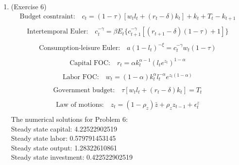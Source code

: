 \documentclass[letterpaper,12pt]{article}
\theoremstyle{definition}
\begin{document}
\begin{enumerate}
	\item(Exercise 6)\\
	\begin{equation} \label{eq1}
	\begin{split}
	\text{Budget cosntraint:} \quad c_{t} = (1 - \tau)[w_{t}l_{t} + (r_{t} - \delta)k_{t}] + k_{t} + T_{t} - k_{t + 1}\\
	\end{split}
	\end{equation}
	\begin{equation} \label{eq2}
	\begin{split}
	\text{Intertemporal Euler:} \quad c_{t}^{-\gamma} = \beta E_{t}\{  c_{t + 1}^{-\gamma}[(r_{t + 1} - \delta)(1 - \tau) + 1]\} \\
	\end{split}
	\end{equation}
	\begin{equation} \label{eq3}
	\begin{split}
	\text{Consumption-leisure Euler:} \quad a(1 - l_{t})^{-\xi} = c_{t}^{-\gamma}w_{t}(1 - \tau)\\
	\end{split}
	\end{equation}
	\begin{equation} \label{eq4}
	\begin{split}
	\text{Capital FOC:} \quad r_{t} = \alpha k_{t}^{\alpha - 1} (l_{t}e^{z_{t}})^{1 - \alpha} \\
	\end{split}
	\end{equation}
	\begin{equation} \label{eq5}
	\begin{split}
	\text{Labor FOC:} \quad w_{t} = (1 - \alpha)k_{t}^{\alpha} l_{t}^{- \alpha} e^{z_{t}(1 - \alpha)} \\
	\end{split}
	\end{equation}
	\begin{equation} \label{eq6}
	\begin{split}
	\text{Government budget:} \quad \tau[w_{t}l_{t} + (r_{t} - \delta)k_{t}] = T_{t}  \\
	\end{split}
	\end{equation}
	\begin{equation} \label{eq7}
	\begin{split}
	\text{Law of motions:} \quad z_{t} = (1 - \rho_{z})\bar{z} + \rho_{z}z_{t - 1} + \epsilon_{t}^{z} \\
	\end{split}
	\end{equation}
	The numerical solutions for Problem 6: \\

	Steady state capital:  4.22522902519\\
	Steady state labor:  0.579791453145\\
	Steady state output:  1.28322610861\\
	Steady state investment:  0.422522902519\\



\end{enumerate}

\vspace{25mm}
\end{document}
